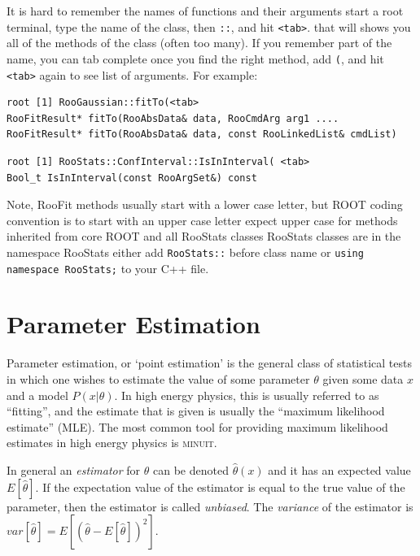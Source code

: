 \documentclass[11pt]{article}
\begin{document}
It is hard to remember the names of functions and their arguments
start a root terminal, type the name of the class, then \texttt{::}, and hit \texttt{<tab>}.  
that will shows you all of the methods of the class (often too many).
If you remember part of the name, you can tab complete
once you find the right method, add \texttt{(}, and hit \texttt{<tab>} again to see list of arguments.  For example:
\begin{lstlisting}[backgroundcolor=\color{shellcommand}]
root [1] RooGaussian::fitTo(<tab>
RooFitResult* fitTo(RooAbsData& data, RooCmdArg arg1 ....
RooFitResult* fitTo(RooAbsData& data, const RooLinkedList& cmdList)
\end{lstlisting}
\begin{lstlisting}[backgroundcolor=\color{shellcommand}]
root [1] RooStats::ConfInterval::IsInInterval( <tab>
Bool_t IsInInterval(const RooArgSet&) const
\end{lstlisting}
Note, RooFit methods usually start with a lower case letter, but ROOT coding convention is to start with an upper case letter
expect upper case for methods inherited from core ROOT and all RooStats classes
RooStats classes are in the namespace RooStats
either add \texttt{RooStats::} before class name or \texttt{using namespace RooStats;} to your C++ file.



\section{Parameter Estimation}

Parameter estimation, or `point estimation' is the general class of statistical tests in which one wishes to estimate the value of some parameter $\theta$ given some data $x$ and a model $P(x|\theta)$.  In high energy physics, this is usually referred to as ``fitting'', and the estimate that is given is usually the ``maximum likelihood estimate'' (MLE).  The most common tool for providing maximum likelihood estimates in high energy physics is \textsc{minuit}.

In general an \textit{estimator} for $\theta$ can be denoted $\hat{\theta}(x)$ and it has an expected value $E[\hat{\theta}]$.  If the expectation value of the estimator is equal to the true value of the parameter, then the estimator is called \textit{unbiased}.   The \textit{variance} of the estimator is $var[\hat\theta] = E[ (\hat\theta - E[\hat\theta])^2]$.  
\end{document}
